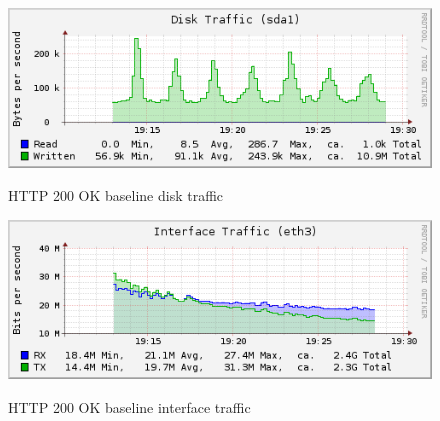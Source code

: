\documentclass[Measurement results]{subfiles}
\begin{document}
\begin{figure}[H]
\centering
\caption{HTTP 200 OK baseline disk traffic}
\includegraphics[scale=0.7]{images/results/200_with_naxsi_incremented_disallowed_parameters/disk.png}
\label{fig:Baseline Nginx disk traffic}
\end{figure}

\begin{figure}[H]
\centering
\caption{HTTP 200 OK baseline interface traffic}
\includegraphics[scale=0.7]{images/results/200_with_naxsi_incremented_disallowed_parameters/interface.png}
\label{fig:Baseline Nginx interface traffic}
\end{figure}
\end{document}
